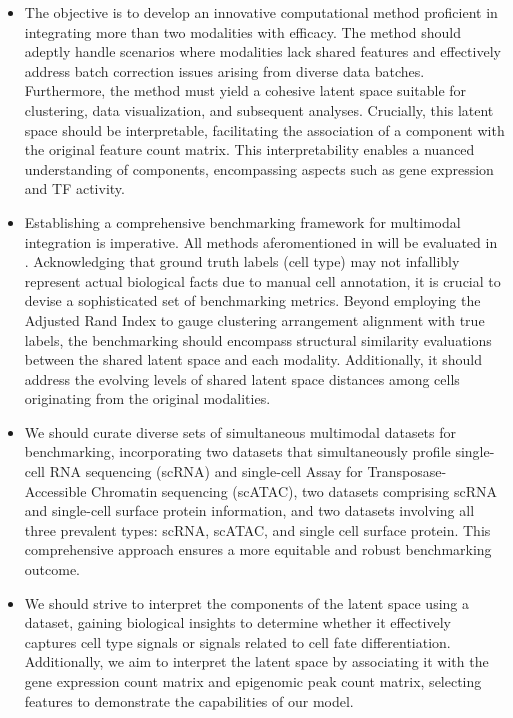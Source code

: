 \begin{itemize}
	\item
	The objective is to develop an innovative computational method proficient in integrating more than two modalities with efficacy. The method should adeptly handle scenarios where modalities lack shared features and effectively address batch correction issues arising from diverse data batches. Furthermore, the method must yield a cohesive latent space suitable for clustering, data visualization, and subsequent analyses. Crucially, this latent space should be interpretable, facilitating the association of a component with the original feature count matrix. This interpretability enables a nuanced understanding of components, encompassing aspects such as gene expression and TF activity.
	\item
	Establishing a comprehensive benchmarking framework for multimodal integration is imperative. All methods aferomentioned in  will be evaluated in . Acknowledging that ground truth labels (cell type) may not infallibly represent actual biological facts due to manual cell annotation, it is crucial to devise a sophisticated set of benchmarking metrics. Beyond employing the Adjusted Rand Index to gauge clustering arrangement alignment with true labels, the benchmarking should encompass structural similarity evaluations between the shared latent space and each modality. Additionally, it should address the evolving levels of shared latent space distances among cells originating from the original modalities.

	\item
	We should curate diverse sets of simultaneous multimodal datasets for benchmarking, incorporating two datasets that simultaneously profile single-cell RNA sequencing (scRNA) and single-cell Assay for Transposase-Accessible Chromatin sequencing (scATAC), two datasets comprising scRNA and single-cell surface protein information, and two datasets involving all three prevalent types: scRNA, scATAC, and single cell surface protein. This comprehensive approach ensures a more equitable and robust benchmarking outcome.

	\item
	We should strive to interpret the components of the latent space using a dataset, gaining biological insights to determine whether it effectively captures cell type signals or signals related to cell fate differentiation. Additionally, we aim to interpret the latent space by associating it with the gene expression count matrix and epigenomic peak count matrix, selecting features to demonstrate the capabilities of our model.
\end{itemize}
\FloatBarrier %

